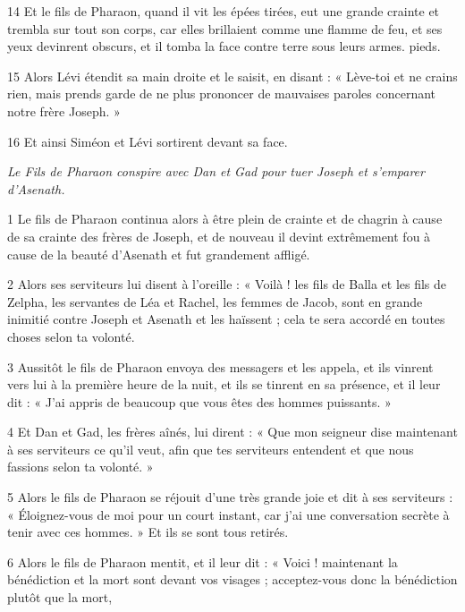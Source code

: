 \par 14 Et le fils de Pharaon, quand il vit les épées tirées, eut une grande crainte et trembla sur tout son corps, car elles brillaient comme une flamme de feu, et ses yeux devinrent obscurs, et il tomba la face contre terre sous leurs armes. pieds.

\par 15 Alors Lévi étendit sa main droite et le saisit, en disant : « Lève-toi et ne crains rien, mais prends garde de ne plus prononcer de mauvaises paroles concernant notre frère Joseph. »

\par 16 Et ainsi Siméon et Lévi sortirent devant sa face.


\par \textit{Le Fils de Pharaon conspire avec Dan et Gad pour tuer Joseph et s'emparer d'Asenath.}


\par 1 Le fils de Pharaon continua alors à être plein de crainte et de chagrin à cause de sa crainte des frères de Joseph, et de nouveau il devint extrêmement fou à cause de la beauté d'Asenath et fut grandement affligé.

\par 2 Alors ses serviteurs lui disent à l'oreille : « Voilà ! les fils de Balla et les fils de Zelpha, les servantes de Léa et Rachel, les femmes de Jacob, sont en grande inimitié contre Joseph et Asenath et les haïssent ; cela te sera accordé en toutes choses selon ta volonté.

\par 3 Aussitôt le fils de Pharaon envoya des messagers et les appela, et ils vinrent vers lui à la première heure de la nuit, et ils se tinrent en sa présence, et il leur dit : « J’ai appris de beaucoup que vous êtes des hommes puissants. »

\par 4 Et Dan et Gad, les frères aînés, lui dirent : « Que mon seigneur dise maintenant à ses serviteurs ce qu'il veut, afin que tes serviteurs entendent et que nous fassions selon ta volonté. »

\par 5 Alors le fils de Pharaon se réjouit d'une très grande joie et dit à ses serviteurs : « Éloignez-vous de moi pour un court instant, car j'ai une conversation secrète à tenir avec ces hommes. » Et ils se sont tous retirés.

\par 6 Alors le fils de Pharaon mentit, et il leur dit : « Voici ! maintenant la bénédiction et la mort sont devant vos visages ; acceptez-vous donc la bénédiction plutôt que la mort,

